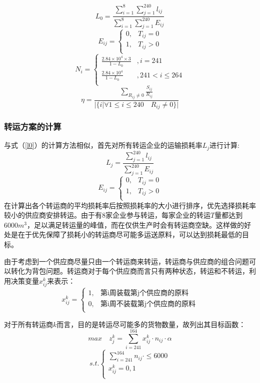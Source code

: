 \documentclass{my_paper}
\begin{document}
$$L_0 = \frac{\sum\limits^8_{i=1}\sum\limits^{240}_{j=1}l_{ij}}{\sum\limits^8_{i=1}\sum\limits^{240}_{j=1}E_{ij}}$$
$$E_{ij} = \begin{cases}
    0 ,& T_{ij}=0\\
    1 ,& T_{ij}>0\\
\end{cases}$$
$$N_i = \begin{cases}
    \frac{2.84\times 10^4 \times 3 }{1-L_0}&,i=241 \\
    \frac{2.84\times 10^4 }{1-L_0}&,241<i\leq 264\\\end{cases}$$
$$\eta = \frac{\sum\limits_{R_{ij}\neq 0} \frac{S_{ij}}{R_{ij}}}{|\{i|\forall 1\leq i\leq 240 \quad R_{ij}\neq 0 \}|}$$


\newpage
\subsubsection{转运方案的计算}
与式（\ref{l0}）的计算方法相似，首先对所有转运企业的运输损耗率$L_j$进行计算:
\begin{equation}
    L_j = \frac{\sum\limits^{240}_{j=1}l_{ij}}{\sum\limits^{240}_{j=1}E_{ij}}
\label{lj}
\end{equation}
$$E_{ij} = \begin{cases}
    0 ,& T_{ij}=0\\
    1 ,& T_{ij}>0\\
\end{cases}$$
在计算出各个转运商的平均损耗率后按照损耗率的大小进行排序，优先选择损耗率较小的供应商安排转运。由于有8家企业参与转运，每家企业的转运$T$量都达到$6000m^3$，足以满足转运量的峰值，而在仅供生产时会有转运商空缺。这样做的好处是在于优先保障了损耗小的转运商尽可能多运送原料，可以达到损耗最低的目标。

由于考虑到一个供应商尽量只由一个转运商来转运，转运商与供应商的组合问题可以转化为背包问题。转运商对于每个供应商而言只有两种状态，转运和不转运，利用决策变量$x^k_{ij}$来表示：
\begin{equation}
x^{k}_{ij} = \begin{cases}
    1,& \text{第i周装载第j个供应商的原料}\\
    0,& \text{第i周不装载第j个供应商的原料}\\
\end{cases}
\label{xij}
\end{equation}

对于所有转运商$k$而言，目的是转运尽可能多的货物数量，故列出其目标函数：
\begin{equation}
max \quad z^k_j = \sum\limits^{164}_{i=241} x^{k}_{ij}\cdot n_{ij} \cdot \alpha
\label{z}
\end{equation}
\begin{equation}
    s.t.\begin{cases}
        \sum\limits^{164}_{i=241} n_{ij}\cdot \leq 6000\\
        x^{k}_{ij} = 0,1 \\
    \end{cases}
\end{equation}
\end{document}
